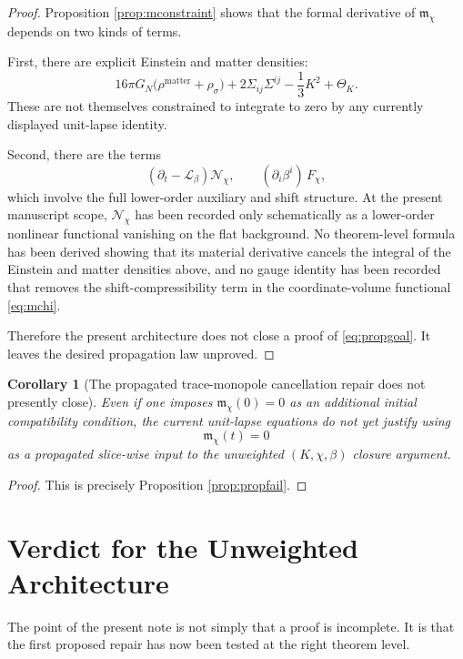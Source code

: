\documentclass[11pt]{article}
\newcommand{\Ell}{\mathcal{L}}
\newtheorem{corollary}{Corollary}
\begin{document}
\begin{proof}
Proposition \ref{prop:mconstraint} shows that the formal derivative of \(\mathfrak m_\chi\) depends on two kinds of terms.

First, there are explicit Einstein and matter densities:
\[
16\pi G_N\bigl(\rho^{\mathrm{matter}}+\rho_\sigma\bigr)
+ 2\Sigma_{ij}\Sigma^{ij}
- \frac{1}{3}K^2
+ \Theta_K.
\]
These are not themselves constrained to integrate to zero by any currently displayed unit-lapse identity.

Second, there are the terms
\[
(\partial_t-\Ell_\beta)\mathcal N_\chi,
\qquad
(\partial_i\beta^i)\,F_\chi,
\]
which involve the full lower-order auxiliary and shift structure. At the present manuscript scope, \(\mathcal N_\chi\) has been recorded only schematically as a lower-order nonlinear functional vanishing on the flat background. No theorem-level formula has been derived showing that its material derivative cancels the integral of the Einstein and matter densities above, and no gauge identity has been recorded that removes the shift-compressibility term in the coordinate-volume functional \eqref{eq:mchi}.

Therefore the present architecture does not close a proof of \eqref{eq:propgoal}. It leaves the desired propagation law unproved.
\end{proof}

\begin{corollary}[The propagated trace-monopole cancellation repair does not presently close]
\label{cor:noclose}
Even if one imposes \(\mathfrak m_\chi(0)=0\) as an additional initial compatibility condition, the current unit-lapse equations do not yet justify using
\[
\mathfrak m_\chi(t)=0
\]
as a propagated slice-wise input to the unweighted \((K,\chi,\beta)\) closure argument.
\end{corollary}

\begin{proof}
This is precisely Proposition \ref{prop:propfail}.
\end{proof}

\section{Verdict for the Unweighted Architecture}

The point of the present note is not simply that a proof is incomplete. It is that the first proposed repair has now been tested at the right theorem level.
\end{document}
